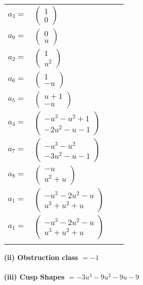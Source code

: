 \documentclass[1p]{elsarticle_modified}
\theoremstyle{definition}
\begin{document}
\begin{tabular}{m{7pt} m{180pt} m{7pt} m{180pt} }
\flushright $a_{3}=$&$\begin{pmatrix}1\\0\end{pmatrix}$ \\
\flushright $a_{9}=$&$\begin{pmatrix}0\\u\end{pmatrix}$ \\
\flushright $a_{2}=$&$\begin{pmatrix}1\\u^2\end{pmatrix}$ \\
\flushright $a_{6}=$&$\begin{pmatrix}1\\- u\end{pmatrix}$ \\
\flushright $a_{5}=$&$\begin{pmatrix}u+1\\- u\end{pmatrix}$ \\
\flushright $a_{4}=$&$\begin{pmatrix}- u^3- u^2+1\\-2 u^2- u-1\end{pmatrix}$ \\
\flushright $a_{7}=$&$\begin{pmatrix}- u^3- u^2\\-3 u^2- u-1\end{pmatrix}$ \\
\flushright $a_{8}=$&$\begin{pmatrix}- u\\u^2+u\end{pmatrix}$ \\
\flushright $a_{1}=$&$\begin{pmatrix}- u^3-2 u^2- u\\u^3+u^2+u\end{pmatrix}$\\ \flushright $a_{1}=$&$\begin{pmatrix}- u^3-2 u^2- u\\u^3+u^2+u\end{pmatrix}$\\&\end{tabular}
\flushleft \textbf{(ii) Obstruction class $= -1$}\\~\\
\flushleft \textbf{(iii) Cusp Shapes $= -3 u^3-9 u^2-9 u-9$}\\~\\
\end{document}
